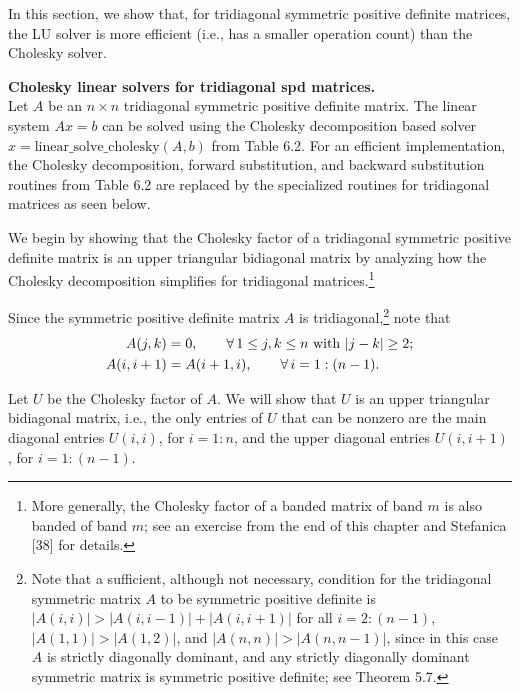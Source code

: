 
In this section, we show that, for tridiagonal symmetric positive definite matrices,
the LU solver is more efficient (i.e., has a smaller operation count) than the
Cholesky solver.

\medskip
\noindent\textbf{Cholesky linear solvers for tridiagonal spd matrices.}\\
Let $A$ be an $n \times n$ tridiagonal symmetric positive definite matrix. The linear
system $Ax = b$ can be solved using the Cholesky decomposition based solver $x =
\text{linear\_solve\_cholesky}(A,b)$ from Table 6.2. For an efficient implementation,
the Cholesky decomposition, forward substitution, and backward substitution routines
from Table 6.2 are replaced by the specialized routines for tridiagonal matrices as
seen below.

We begin by showing that the Cholesky factor of a tridiagonal symmetric positive
definite matrix is an upper triangular bidiagonal matrix by analyzing how the Cholesky
decomposition simplifies for tridiagonal matrices.\footnote{More generally, the
Cholesky factor of a banded matrix of band $m$ is also banded of band $m$; see an
exercise from the end of this chapter and Stefanica [38] for details.}

Since the symmetric positive definite matrix $A$ is tridiagonal,\footnote{Note that a
sufficient, although not necessary, condition for the tridiagonal symmetric matrix $A$
to be symmetric positive definite is $|A(i,i)| > |A(i,i-1)| + |A(i,i+1)|$ for all $i =
2:(n-1)$, $|A(1,1)| > |A(1,2)|$, and $|A(n,n)| > |A(n,n-1)|$, since in this case $A$ is
strictly diagonally dominant, and any strictly diagonally dominant symmetric matrix is
symmetric positive definite; see Theorem 5.7.} note that
\begin{align}
A(j,k) &= 0, \qquad \forall\, 1 \le j,k \le n \text{ with } |j-k| \ge 2; \\
A(i,i+1) &= A(i+1,i), \qquad \forall\, i = 1:(n-1). \notag
\end{align}

Let $U$ be the Cholesky factor of $A$. We will show that $U$ is an upper triangular
bidiagonal matrix, i.e., the only entries of $U$ that can be nonzero are the main
diagonal entries $U(i,i)$, for $i = 1:n$, and the upper diagonal entries $U(i,i+1)$,
for $i = 1:(n-1)$.

